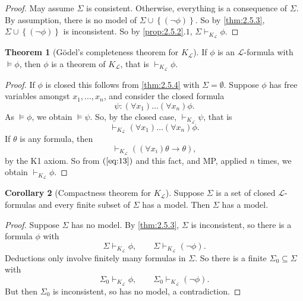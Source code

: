 \documentclass{article}
\renewcommand{\L}{\mathcal{L}}
\newcommand{\rb}[1]{\left( #1 \right)}
\newcommand{\cb}[1]{\left\{ #1 \right\}}
\newcommand{\notb}[1]{\rb{\neg #1}}
\newcommand{\impb}[2]{\rb{#1 \rightarrow #2}}
\newcommand{\fab}[1]{\rb{\forall #1}}
\theoremstyle{definition}\newtheorem{definition}{Definition}[subsection]
\theoremstyle{definition}\newtheorem{remark1}[definition]{Remark}
\theoremstyle{definition}\newtheorem{example1}[definition]{Example}
\theoremstyle{definition}\newtheorem*{remark2}{Remark}
\theoremstyle{definition}\newtheorem*{example2}{Example}
\theoremstyle{definition}\newtheorem*{note}{Note}
\theoremstyle{definition}\newtheorem*{notation}{Notation}
\newtheorem{theorem}[definition]{Theorem}
\newtheorem{corollary}[definition]{Corollary}
\begin{document}
\begin{proof}
May assume $ \Sigma $ is consistent. Otherwise, everything is a consequence of $ \Sigma $. By assumption, there is no model of $ \Sigma \cup \cb{\notb{\phi}} $. So by \ref{thm:2.5.3}, $ \Sigma \cup \cb{\notb{\phi}} $ is inconsistent. So by \ref{prop:2.5.2}.$ 1 $, $ \Sigma \vdash_{K_{\L}} \phi $.
\end{proof}

\begin{theorem}[G\"odel's completeness theorem for $ K_{\L} $]
If $ \phi $ is an $ \L $-formula with $ \vDash \phi $, then $ \phi $ is a theorem of $ K_{\L} $, that is $ \vdash_{K_{\L}} \phi $.
\end{theorem}

\begin{proof}
If $ \phi $ is closed this follows from \ref{thm:2.5.4} with $ \Sigma = \emptyset $. Suppose $ \phi $ has free variables amongst $ x_1, \dots, x_n $, and consider the closed formula
$$ \psi : \fab{x_1} \dots \fab{x_n}\phi. $$
As $ \vDash \phi $, we obtain $ \vDash \psi $. So, by the closed case, $ \vdash_{K_{\L}} \psi $, that is
\begin{equation}
\label{eq:13}
\vdash_{K_{\L}} \fab{x_1} \dots \fab{x_n}\phi.
\end{equation}
If $ \theta $ is any formula, then
$$ \vdash_{K_{\L}} \impb{\fab{x_i}\theta}{\theta}, $$
by the K1 axiom. So from $ \rb{\ref{eq:13}} $ and this fact, and MP, applied $ n $ times, we obtain $ \vdash_{K_{\L}} \phi $.
\end{proof}

\begin{corollary}[Compactness theorem for $ K_{\L} $]
\label{cor:2.5.6}
Suppose $ \Sigma $ is a set of closed $ \L $-formulas and every finite subset of $ \Sigma $ has a model. Then $ \Sigma $ has a model.
\end{corollary}

\begin{proof}
Suppose $ \Sigma $ has no model. By \ref{thm:2.5.3}, $ \Sigma $ is inconsistent, so there is a formula $ \phi $ with
$$ \Sigma \vdash_{K_{\L}} \phi, \qquad \Sigma \vdash_{K_{\L}} \notb{\phi}. $$ Deductions only involve finitely many formulas in $ \Sigma $. So there is a finite $ \Sigma_0 \subseteq \Sigma $ with
$$ \Sigma_0 \vdash_{K_{\L}} \phi, \qquad \Sigma_0 \vdash_{K_{\L}} \notb{\phi}. $$
But then $ \Sigma_0 $ is inconsistent, so has no model, a contradiction.
\end{proof}

\end{document}
